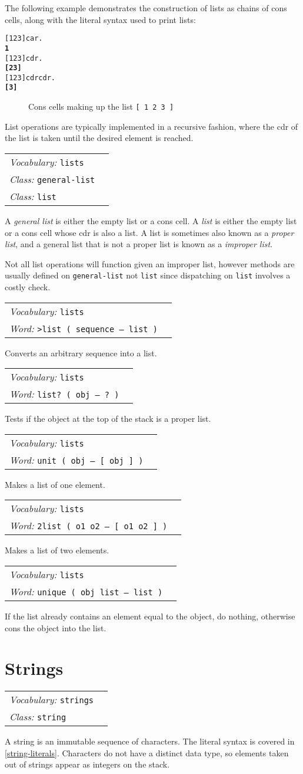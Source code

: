 \documentclass{book}
\newcommand{\vocabulary}[1]{\emph{Vocabulary:} \texttt{#1}&\\}
\newcommand{\ordinaryword}[2]{\index{\texttt{#1}}\emph{Word:} \texttt{#2}&\\}
\newcommand{\classword}[1]{\index{\texttt{#1}}\emph{Class:} \texttt{#1}&\\}
\newcommand{\wordtable}[1]{


\begin{tabularx}{12cm}{lX}
\hline
#1
\hline
\end{tabularx}

}
\begin{document}
The following example demonstrates the construction of lists as chains of cons cells, along with the literal syntax used to print lists:
\begin{alltt}
  {[} 1 2 3 {]} car .
\textbf{1}
  {[} 1 2 3 {]} cdr .
\textbf{{[} 2 3 {]}}
  {[} 1 2 3 {]} cdr cdr .
\textbf{{[} 3 {]}}
\end{alltt}

\begin{figure}
\caption{Cons cells making up the list \texttt{[ 1 2 3 ]}}
\begin{center}
\end{center}
\end{figure}

List operations are typically implemented in a recursive fashion, where the cdr of the list is taken until the desired element is reached.

\wordtable{
\vocabulary{lists}
\classword{general-list}
\classword{list}
}
A \emph{general list} is either the empty list or a cons cell. A \emph{list} is either the empty list or a cons cell whose cdr is also a list. A list is sometimes also known as a \emph{proper list}, and a general list that is not a proper list is known as a \emph{improper list}.

Not all list operations will function given an improper list,
however methods are usually defined on \texttt{general-list} not \texttt{list} since dispatching on \texttt{list} involves a costly check.

\wordtable{
\vocabulary{lists}
\ordinaryword{>list}{>list ( sequence -- list )}
}
Converts an arbitrary sequence into a list.
\wordtable{
\vocabulary{lists}
\ordinaryword{list?}{list?~( obj -- ?~)}
}
Tests if the object at the top of the stack is a proper list.
\wordtable{
\vocabulary{lists}
\ordinaryword{unit}{unit ( obj -- [ obj ] )}
}
Makes a list of one element.
\wordtable{
\vocabulary{lists}
\ordinaryword{2list}{2list ( o1 o2 -- [ o1 o2 ] )}
}
Makes a list of two elements.
\wordtable{
\vocabulary{lists}
\ordinaryword{unique}{unique ( obj list -- list )}
}
If the list already contains an element equal to the object, do nothing, otherwise cons the object into the list.

\section{Strings}\label{strings}

\stringglos
\wordtable{
\vocabulary{strings}
\classword{string}
}
A string is an immutable sequence of characters. The literal syntax is covered in \ref{string-literals}. Characters do not have a distinct data type, so elements taken out of strings appear as integers on the stack.
\end{document}
